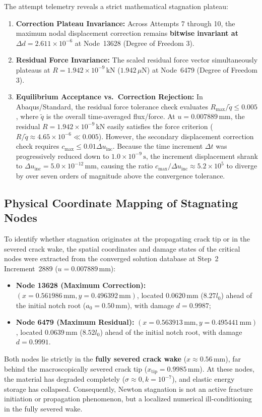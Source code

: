 The attempt telemetry reveals a strict mathematical stagnation plateau:
\begin{enumerate}
  \item \textbf{Correction Plateau Invariance:} Across Attempts 7 through 10, the maximum nodal displacement correction remains \textbf{bitwise invariant at $\Delta d = 2.611\times 10^{-6}$} at Node~13628 (Degree of Freedom 3).
  \item \textbf{Residual Force Invariance:} The scaled residual force vector simultaneously plateaus at $R = 1.942\times 10^{-9}\,\mathrm{kN}$ ($1.942\,\mu\mathrm{N}$) at Node~6479 (Degree of Freedom 3).
  \item \textbf{Equilibrium Acceptance vs.\ Correction Rejection:} In Abaqus/Standard, the residual force tolerance check evaluates $R_{\max} / \tilde{q} \le 0.005$, where $\tilde{q}$ is the overall time-averaged flux/force. At $u = 0.007889\,\mathrm{mm}$, the residual $R = 1.942\times 10^{-9}\,\mathrm{kN}$ easily satisfies the force criterion ($R / \tilde{q} \approx 4.65\times 10^{-6} \ll 0.005$). However, the secondary displacement correction check requires $c_{\max} \le 0.01 \Delta u_{\mathrm{inc}}$. Because the time increment $\Delta t$ was progressively reduced down to $1.0\times 10^{-9}\,\mathrm{s}$, the increment displacement shrank to $\Delta u_{\mathrm{inc}} = 5.0\times 10^{-12}\,\mathrm{mm}$, causing the ratio $c_{\max} / \Delta u_{\mathrm{inc}} \approx 5.2\times 10^5$ to diverge by over seven orders of magnitude above the convergence tolerance.
\end{enumerate}

\subsection{Physical Coordinate Mapping of Stagnating Nodes}
\label{subsec:stage14uag_spatial_mapping}

To identify whether stagnation originates at the propagating crack tip or in the severed crack wake, the spatial coordinates and damage states of the critical nodes were extracted from the converged solution database at Step~2 Increment~2889 ($u = 0.007889\,\mathrm{mm}$):
\begin{itemize}
  \item \textbf{Node 13628 (Maximum Correction):} $(x = 0.561986\,\mathrm{mm}, y = 0.496392\,\mathrm{mm})$, located $0.0620\,\mathrm{mm}$ ($8.27 l_0$) ahead of the initial notch root ($a_0 = 0.50\,\mathrm{mm}$), with damage $d = 0.9987$;
  \item \textbf{Node 6479 (Maximum Residual):} $(x = 0.563913\,\mathrm{mm}, y = 0.495441\,\mathrm{mm})$, located $0.0639\,\mathrm{mm}$ ($8.52 l_0$) ahead of the initial notch root, with damage $d = 0.9991$.
\end{itemize}
Both nodes lie strictly in the \textbf{fully severed crack wake} ($x \approx 0.56\,\mathrm{mm}$), far behind the macroscopically severed crack tip ($x_{\mathrm{tip}} = 0.9985\,\mathrm{mm}$). At these nodes, the material has degraded completely ($\sigma \approx 0, k=10^{-7}$), and elastic energy storage has collapsed. Consequently, Newton stagnation is not an active fracture initiation or propagation phenomenon, but a localized numerical ill-conditioning in the fully severed wake.

